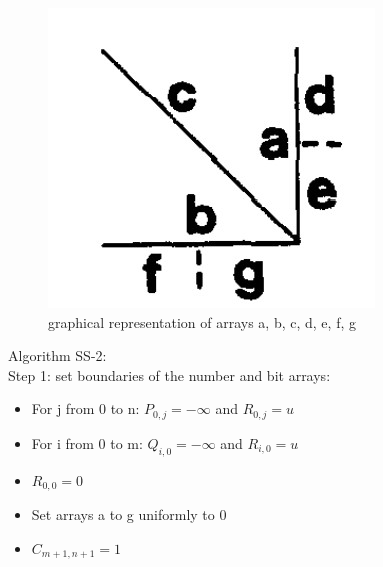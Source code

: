 \documentclass{article}
\begin{document}
	\begin{figure}[h]
		\centering
		\includegraphics{figures/q5_3.jpg}
		\caption{graphical representation of arrays a, b, c, d, e, f, g}
		\label{fig:Q5_3}
	\end{figure}

	Algorithm SS-2:\\
	Step 1: set boundaries of the number and bit arrays:
	\begin{itemize}
		\item For j from 0 to n: $ P_{0, j} = - \infty $ and $ R_{0, j} = u $
		\item For i from 0 to m: $ Q_{i, 0} = - \infty $ and $ R_{i, 0} = u $
		\item $ R_{0, 0} = 0 $
		\item Set arrays a to g uniformly to 0
		\item $ C_{m+1, n+1} = 1 $
	\end{itemize}
\end{document}

